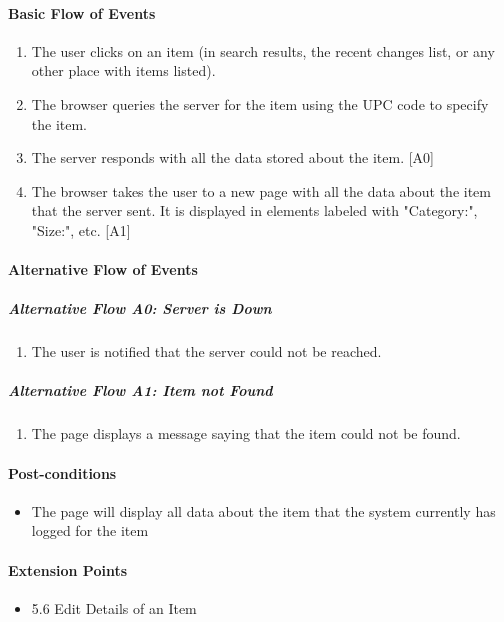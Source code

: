 \documentclass{article}
\begin{document}
\paragraph{Basic Flow of Events}
\begin{enumerate}
\item The user clicks on an item (in search results, the recent changes list, or any other place with items listed).
\item The browser queries the server for the item using the UPC code to specify the item.
\item The server responds with all the data stored about the item. [A0]
\item The browser takes the user to a new page with all the data about the item that the server sent.  It is displayed in elements labeled with "Category:", "Size:", etc. [A1]
\end{enumerate}

\paragraph{Alternative Flow of Events}

\subparagraph{Alternative Flow A0: Server is Down}
\begin{enumerate}
\item The user is notified that the server could not be reached.
\end{enumerate}

\subparagraph{Alternative Flow A1: Item not Found}
\begin{enumerate}
\item The page displays a message saying that the item could not be found.
\end{enumerate}

\paragraph{Post-conditions}
\begin{itemize}
\item The page will display all data about the item that the system currently has logged for the item
\end{itemize}

\paragraph{Extension Points}
\begin{itemize}
\item 5.6 Edit Details of an Item
\end{itemize}
\end{document}
